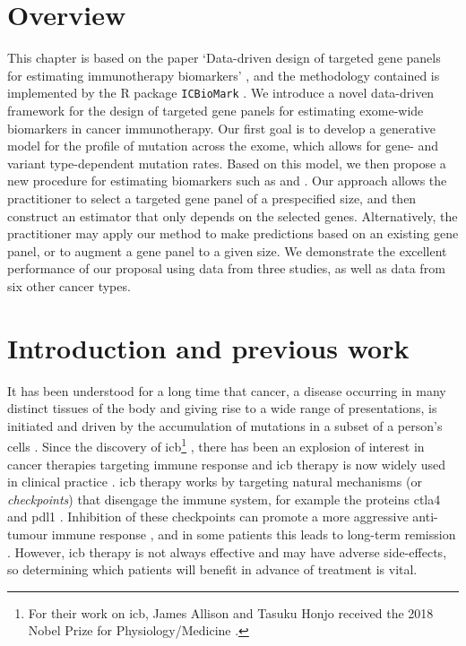\documentclass[../thesis.tex]{subfiles}
\begin{document}
\section{Overview}
This chapter is based on the paper `Data-driven design of targeted gene panels for estimating immunotherapy biomarkers' \citep{bradley_data-driven_2021, bradley_data-driven_2022}, and the methodology contained is implemented by the R package \texttt{ICBioMark} \citep{bradley_icbiomark_2021}. We introduce a novel data-driven framework for the design of targeted gene panels for estimating exome-wide biomarkers in cancer immunotherapy. Our first goal is to develop a generative model for the profile of mutation across the exome, which allows for gene- and variant type-dependent mutation rates. Based on this model, we then propose a new procedure for estimating biomarkers such as  and .  Our approach allows the practitioner to select a targeted gene panel of a prespecified size, and then construct an estimator that only depends on the selected genes.  Alternatively, the practitioner may apply our method to make predictions based on an existing gene panel, or to augment a gene panel to a given size. We demonstrate the excellent performance of our proposal using data from three  studies, as well as data from six other cancer types.  

\section{Introduction and previous work}

It has been understood for a long time that cancer, a disease occurring in many distinct tissues of the body and giving rise to a wide range of presentations, is initiated and driven by the accumulation of mutations in a subset of a person's cells \citep{boveri_concerning_2008}.  Since the discovery of \gls{icb}\footnote{For their work on \gls{icb}, James Allison and Tasuku Honjo received the 2018 Nobel Prize for Physiology/Medicine \citep{ledford_cancer_2018}.}  \citep{ishida_induced_1992,leach_enhancement_1996},  there has been an explosion of interest in cancer therapies targeting immune response and \gls{icb} therapy is now widely used in clinical practice \citep{robert_decade_2020}.  \gls{icb} therapy works by targeting natural mechanisms (or \emph{checkpoints}) that disengage the immune system, for example the proteins \gls{ctla4} and \gls{pdl1} \citep{buchbinder_ctla-4_2016}. Inhibition of these checkpoints can promote a more aggressive anti-tumour immune response \citep{pardoll_blockade_2012}, and in some patients this leads to long-term remission \citep{borghaei_five-year_2021}. However, \gls{icb} therapy is not always effective \citep{nowicki_mechanisms_2018} and may have adverse side-effects, so determining which patients will benefit in advance of treatment is vital. 
\end{document}
